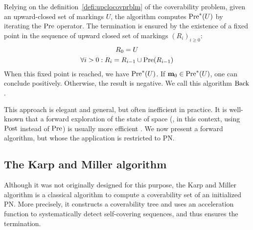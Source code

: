 Relying on the definition~\ref{defi:upclocovprblm} of the coverability problem, given an upward-closed set of markings $U$, the algorithm computes $\operatorname{Pre}^*(U)$ by iterating the $\operatorname{Pre}$ operator.
The termination is ensured by the existence of a fixed point in the sequence of upward closed set of markings $(R_i)_{i \geq 0}$:
\begin{gather*}
  R_0 = U \\
  \forall i > 0 : R_i = R_{i-1} \cup \operatorname{Pre}(R_{i-1})
\end{gather*}
When this fixed point is reached, we have $\operatorname{Pre}^*(U)$.
If $\mathbf{m}_0 \in \operatorname{Pre}^*(U)$, one can conclude positively.
Otherwise, the result is negative.
We call this algorithm $\operatorname{Back}$.

This approach is elegant and general, but often inefficient in practice.
It is well-known that a forward exploration of the state of space (, in this context, using $\operatorname{Post}$ instead of $\operatorname{Pre}$) is usually more efficient \citep{Henzinger98}.
We now present a forward algorithm, but whose the application is restricted to \ac{PN}.

\subsection{The Karp and Miller algorithm}

Although it was not originally designed for this purpose, the Karp and Miller algorithm \cite{Karp69} is a classical algorithm to compute a coverability set of an initialized \ac{PN}.
More precisely, it constructs a coverability tree and uses an acceleration function to systematically detect self-covering sequences, and thus ensures the termination.


